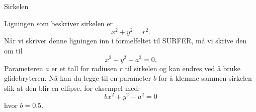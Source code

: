 \documentclass[no]{./../../common/SurferDesc}%
\begin{document}
\footnotesize
%


\begin{surferPage}
  \begin{surferTitle}Sirkelen\end{surferTitle}
   \begin{surferText}
   
Ligningen som beskriver sirkelen er		
\[x^2+y^2=r^2.\]
Når vi skriver denne ligningen inn i formelfeltet til SURFER, må vi skrive den om til
\[x^2+y^2-a^2=0.\]
Parameteren $a$ er et tall for radiusen $r$ til sirkelen og kan endres ved å bruke glidebryteren.
 Nå kan du legge til en parameter $b$ for å klemme sammen sirkelen slik at den blir en ellipse, 
 for eksempel med:
\[bx^2+y^2-a^2=0\] hvor $b=0.5$.


     \end{surferText}
\end{surferPage}
\end{document}
